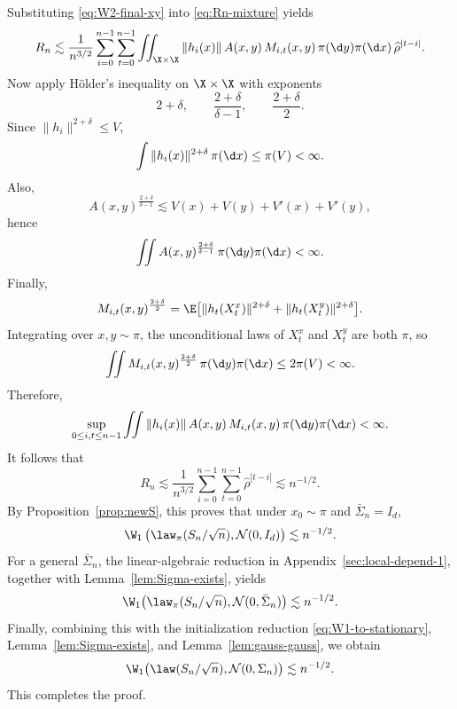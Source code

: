 \documentclass[mnsc,nonblindrev]{informs3}
\begin{document}
Substituting \eqref{eq:W2-final-xy} into \eqref{eq:Rn-mixture} yields
\[
  R_n
  \lesssim
  \frac1{n^{3/2}}
  \sum_{i=0}^{n-1}\sum_{t=0}^{n-1}
  \iint_{\X\times\X}
    \|h_i(x)\|\,A(x,y)\,M_{i,t}(x,y)\,
  \pi(\d y)\pi(\d x)\,
  \widehat\rho^{|t-i|}.
\]
Now apply H\"older's inequality on \(\X\times\X\) with exponents
\[
  2+\delta,\qquad \frac{2+\delta}{\delta-1},\qquad \frac{2+\delta}{2}.
\]
Since \(\|h_i\|^{2+\delta}\le V\),
\[
  \int \|h_i(x)\|^{2+\delta}\,\pi(\d x)\le \pi(V)<\infty.
\]
Also,
\[
  A(x,y)^{\frac{2+\delta}{\delta-1}}
  \lesssim
  V(x)+V(y)+V'(x)+V'(y),
\]
hence
\[
  \iint A(x,y)^{\frac{2+\delta}{\delta-1}}
  \,\pi(\d y)\pi(\d x)
  <\infty.
\]
Finally,
\[
  M_{i,t}(x,y)^{\frac{2+\delta}{2}}
  =
  \E\big[
    \|h_t(X_t^x)\|^{2+\delta}
    +
    \|h_t(X_t^y)\|^{2+\delta}
  \big].
\]
Integrating over \(x,y\sim\pi\), the unconditional laws of \(X_t^x\) and
\(X_t^y\) are both \(\pi\), so
\[
  \iint M_{i,t}(x,y)^{\frac{2+\delta}{2}}
  \,\pi(\d y)\pi(\d x)
  \le
  2\pi(V)<\infty.
\]
Therefore,
\[
  \sup_{0\le i,t\le n-1}
  \iint
    \|h_i(x)\|\,A(x,y)\,M_{i,t}(x,y)\,
  \pi(\d y)\pi(\d x)
  <\infty.
\]
It follows that
\[
  R_n
  \lesssim
  \frac1{n^{3/2}}
  \sum_{i=0}^{n-1}\sum_{t=0}^{n-1}\widehat\rho^{|t-i|}
  \lesssim
  n^{-1/2}.
\]
By Proposition~\ref{prop:newS}, this proves that under \(x_0\sim\pi\) and
\(\bar\Sigma_n=I_d\),
\[
  \W_1\left(
    \law_\pi(S_n/\sqrt{n}),
    \mathcal N(0,I_d)
  \right)
  \lesssim
  n^{-1/2}.
\]
For a general \(\bar\Sigma_n\), the linear-algebraic reduction in
Appendix~\ref{sec:local-depend-1}, together with Lemma~\ref{lem:Sigma-exists},
yields
\[
  \W_1\!\left(
    \law_\pi(S_n/\sqrt{n}),
    \mathcal N(0,\bar\Sigma_n)
  \right)
  \lesssim
  n^{-1/2}.
\]
Finally, combining this with the initialization reduction
\eqref{eq:W1-to-stationary}, Lemma~\ref{lem:Sigma-exists}, and
Lemma~\ref{lem:gauss-gauss}, we obtain
\[
  \W_1\!\left(
    \law(S_n/\sqrt{n}),
    \mathcal N(0,\Sigma_n)
  \right)
  \lesssim
  n^{-1/2}.
\]
This completes the proof.
\end{document}
